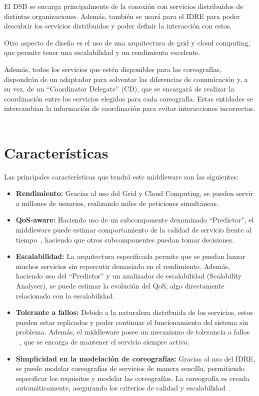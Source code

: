 \documentclass[runningheads]{llncs}
\begin{document}
El DSB se encarga principalmente de la conexión con servicios distribuidos de distintas organizaciones. Además, también se usará para el IDRE para poder descubrir los servicios distribuidos y poder definir la interacción con estos. ~\cite{a_10}

Otro aspecto de diseño es el uso de una arquitectura de grid y cloud computing, que permite tener una escalabilidad y un rendimiento excelente.

Además, todos los servicios que estén disponibles para las coreografías, dispondrán de un adaptador para solventar las diferencias de comunicación y, a su vez, de un ``Coordinator Delegate'' (CD), que se encargará de realizar la coordinación entre los servicios elegidos para cada coreografía. Estas entidades se intercambian la información de coordinación para evitar interacciones incorrectas. ~\cite{a_2}

\section{Características}
Las principales características que tendrá este middleware son las siguientes:

\begin{itemize}
    \item \textbf{Rendimiento: }Gracias al uso del Grid y Cloud Computing, se pueden servir a millones de usuarios, realizando miles de peticiones simultáneas.~\cite{a_1}
    \item \textbf{QoS-aware: }Haciendo uso de un subcomponente denominado ``Predictor'', el middleware puede estimar comportamiento de la calidad de servicio frente al tiempo~\cite{a_10}, haciendo que otros subcomponentes puedan tomar decisiones. 
    \item \textbf{Escalabilidad: }La arquitectura especificada permite que se puedan lanzar muchos servicios sin repercutir demasiado en el rendimiento. Además, haciendo uso del ``Predictor'' y un analizador de escalabilidad (Scalability Analyser), se puede estimar la evolución del QoS, algo directamente relacionado con la escalabilidad. ~\cite{a_10}
    \item \textbf{Tolerante a fallos: }Debido a la naturaleza distribuida de los servicios, estos pueden estar replicados y poder continuar el funcionamiento del sistema sin problema. Además, el middleware posee un mecanismo de tolerancia a fallos ~\cite{a_20}, que se encarga de mantener el servicio siempre activo.
    \item \textbf{Simplicidad en la modelación de coreografías: }Gracias al uso del IDRE, se puede modelar coreografías de servicios de manera sencilla, permitiendo especificar los requisitos y modelar las coreografías. La coreografía es creada automáticamente, asegurando los criterios de calidad y escalabilidad~\cite{a_2}.
\end{itemize}
\end{document}
